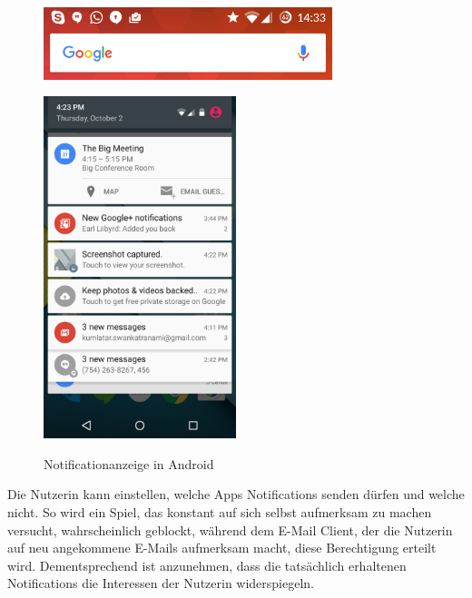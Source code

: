 \begin{figure}%
\begin{minipage}{\textwidth}
\centering
  \includegraphics[width=0.75\textwidth]{images/Screenshot_2016-03-25-14-34-00.png}
  \label{fig:notificationarea}
\end{minipage}
\vfill
\begin{minipage}{\textwidth}
\centering
  \includegraphics[width=0.5\textwidth]{images/notification_drawer.png}
  \label{fig:notificationdrawer}
\end{minipage}
\vspace{-2mm}
\caption{Notificationanzeige in Android}
\label{fig:notAndroid}
\end{figure}

Die Nutzerin kann einstellen, welche Apps Notifications senden dürfen und welche nicht.
So wird ein Spiel, das konstant auf sich selbst aufmerksam zu machen versucht, wahrscheinlich geblockt,
während dem E-Mail Client, der die Nutzerin auf neu angekommene E-Mails aufmerksam macht, diese Berechtigung erteilt wird.
Dementsprechend ist anzunehmen, dass die tatsächlich erhaltenen Notifications die Interessen der Nutzerin widerspiegeln.
\par

